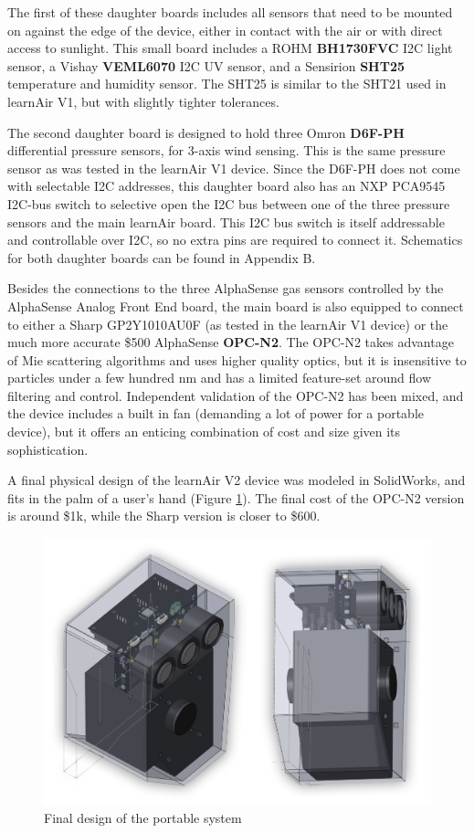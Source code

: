 The first of these daughter boards includes all sensors that need to be mounted on against the edge of the device, either in contact with the air or with direct access to sunlight.  This small board includes a ROHM \textbf{BH1730FVC} I2C light sensor, a Vishay \textbf{VEML6070} I2C UV sensor, and a Sensirion \textbf{SHT25} temperature and humidity sensor.  The SHT25 is similar to the SHT21 used in learnAir V1, but with slightly tighter tolerances. 

The second daughter board is designed to hold three Omron \textbf{D6F-PH} differential pressure sensors, for 3-axis wind sensing.  This is the same pressure sensor as was tested in the learnAir V1 device.  Since the D6F-PH does not come with selectable I2C addresses, this daughter board also has an NXP PCA9545	 I2C-bus switch to selective open the I2C bus between one of the three pressure sensors and the main learnAir board.  This I2C bus switch is itself addressable and controllable over I2C, so no extra pins are required to connect it.  Schematics for both daughter boards can be found in Appendix B.

Besides the connections to the three AlphaSense gas sensors controlled by the AlphaSense Analog Front End board, the main board is also equipped to connect to either a Sharp GP2Y1010AU0F (as tested in the learnAir V1 device) or the much more accurate \$500 AlphaSense \textbf{OPC-N2}.  The OPC-N2 takes advantage of Mie scattering algorithms and uses higher quality optics, but it is insensitive to particles under a few hundred nm and has a limited feature-set around flow filtering and control.  Independent validation of the OPC-N2 has been mixed, and the device includes a built in fan (demanding a lot of power for a portable device), but it offers an enticing combination of cost and size given its sophistication.

A final physical design of the learnAir V2 device was modeled in SolidWorks, and fits in the palm of a user's hand (Figure \ref{fig:learnairbox}).  The final cost of the OPC-N2 version is around \$1k, while the Sharp version is closer to \$600.  

\begin{figure}[htb]
 	\includegraphics[width=\textwidth]{visuals/learnairV2box}               
 	 \caption{Final design of the portable system}
  	\label{fig:learnairbox}
\end{figure}

